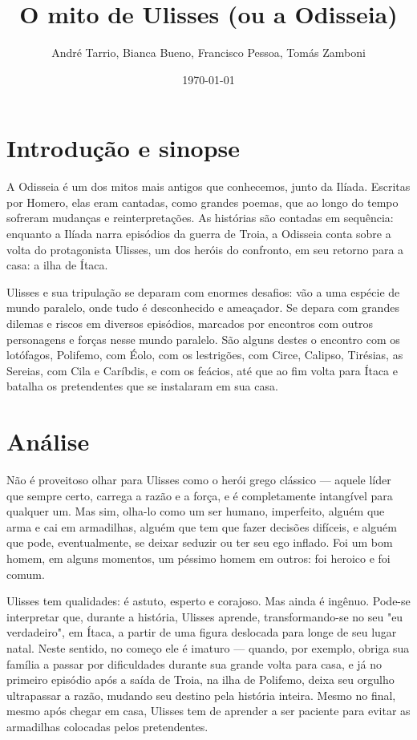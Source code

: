 \documentclass[12pt]{article}
\author{André Tarrio, Bianca Bueno, Francisco Pessoa, Tomás Zamboni}
\date{\today}
\affil{1°EM — Turma A}
\title{O mito de Ulisses (ou a Odisseia)}
\begin{document}
\maketitle

\section{Introdução e sinopse}
A Odisseia é um dos mitos mais antigos que conhecemos, junto da Ilíada. Escritas por Homero, elas eram cantadas, como grandes poemas, que ao longo do tempo sofreram mudanças e reinterpretações. As histórias são contadas em sequência: enquanto a Ilíada narra episódios da guerra de Troia, a Odisseia conta sobre a volta do protagonista Ulisses, um dos heróis do confronto, em seu retorno para a casa: a ilha de Ítaca. 

Ulisses e sua tripulação se deparam com enormes desafios: vão a uma espécie de mundo paralelo, onde tudo é desconhecido e ameaçador. Se depara com grandes dilemas e riscos em diversos episódios, marcados por encontros com outros personagens e forças nesse mundo paralelo. São alguns destes o encontro com os lotófagos, Polifemo, com Éolo, com os lestrigões, com Circe, Calipso, Tirésias, as Sereias, com Cila e Caríbdis, e com os feácios, até que ao fim volta para Ítaca e batalha os pretendentes que se instalaram em sua casa.

\section{Análise}
Não é proveitoso olhar para Ulisses como o herói grego clássico — aquele líder que sempre certo, carrega a razão e a força, e é completamente intangível para qualquer um. Mas sim, olha-lo como um ser humano, imperfeito, alguém que arma e cai em armadilhas, alguém que tem que fazer decisões difíceis, e alguém que pode, eventualmente, se deixar seduzir ou ter seu ego inflado. Foi um bom homem, em alguns momentos, um péssimo homem em outros: foi heroico e foi comum.

Ulisses tem qualidades: é astuto, esperto e corajoso. Mas ainda é ingênuo. Pode-se interpretar que, durante a história, Ulisses aprende, transformando-se no seu "eu verdadeiro", em Ítaca, a partir de uma figura deslocada para longe de seu lugar natal. Neste sentido, no começo ele é imaturo —  quando, por exemplo, obriga sua família a passar por dificuldades durante sua grande volta para casa, e já no primeiro episódio após a saída de Troia, na ilha de Polifemo, deixa seu orgulho ultrapassar a razão, mudando seu destino pela história inteira. Mesmo no final, mesmo após chegar em casa, Ulisses tem de aprender a ser paciente para evitar as armadilhas colocadas pelos pretendentes.
\end{document}
